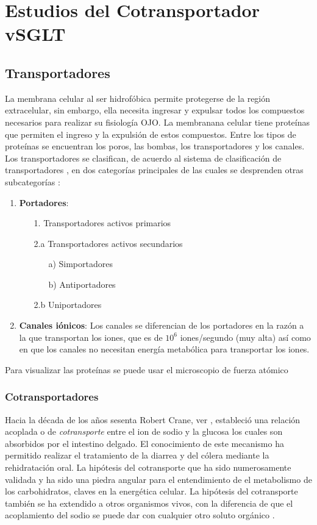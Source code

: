 \chapter{Estudios del Cotransportador vSGLT}


\section{Transportadores}
La membrana celular al ser hidrof\'{o}bica permite protegerse de la regi\'{o}n extracelular, sin embargo, ella necesita ingresar y expulsar todos los compuestos necesarios para realizar su fisiolog\'{i}a OJO. La membranana celular tiene prote\'{i}nas que permiten el ingreso y la expulsi\'{o}n de estos compuestos. Entre los tipos de prote\'{i}nas se encuentran  los poros, las bombas, los transportadores y los canales. \\

Los transportadores se clasifican, de acuerdo al sistema de clasificaci\'{o}n de transportadores \cite{Nelson2011}, en dos categor\'{i}as principales de las cuales se desprenden otras subcategor\'{i}as :
\begin{enumerate}
 \item \textbf{Portadores}:
 \begin{enumerate}
 \item[1.] Transportadores activos primarios
 \item[2.a] Transportadores activos secundarios
  \begin{enumerate}
 \item[a)] Simportadores
 \item[b)] Antiportadores
 \end{enumerate}
 \item[2.b] Uniportadores
 \end{enumerate}
 \item  \textbf{Canales i\'{o}nicos}: Los canales se diferencian de los portadores en la raz\'{o}n a la que transportan los iones, que es de $10^6$ iones/segundo  (muy alta) as\'{i} como en que los canales no necesitan energ\'{i}a metab\'{o}lica para transportar los iones.
\end{enumerate}


Para visualizar las prote\'{i}nas se puede usar el microscopio de fuerza at\'{o}mico
\subsection{Cotransportadores}
Hacia la d\'{e}cada de los a\~{n}os sesenta Robert Crane, ver \cite{Hamilton2013}, estableci\'{o} una relaci\'{o}n acoplada o de \textit{cotransporte} entre el ion de sodio y la glucosa los cuales son absorbidos por el intestino delgado. El conocimiento de este mecanismo ha permitido realizar el tratamiento de la diarrea y del c\'{o}lera mediante la rehidrataci\'{o}n oral. La hip\'{o}tesis del cotransporte que ha sido numerosamente validada y ha sido una piedra angular para el entendimiento de el metabolismo de los carbohidratos, claves en la energ\'{e}tica celular. La hip\'{o}tesis del cotransporte tambi\'{e}n se ha extendido a otros organismos vivos, con la diferencia de que el acoplamiento del sodio se puede dar con cualquier otro soluto org\'{a}nico \cite{Faham2008}.\\
